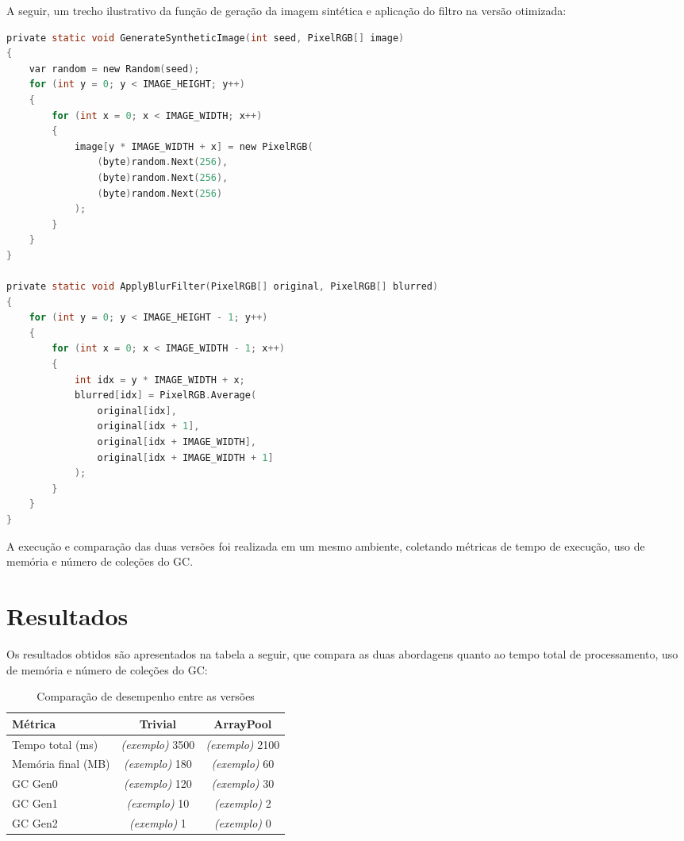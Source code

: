 \documentclass[
	12pt,
	oneside,
	a4paper,
	english,
	brazil,
	]{abntex2}
\begin{document}
{A seguir, um trecho ilustrativo da função de geração da imagem sintética e aplicação do filtro na versão otimizada:

\begin{lstlisting}[language=C]
private static void GenerateSyntheticImage(int seed, PixelRGB[] image)
{
    var random = new Random(seed);
    for (int y = 0; y < IMAGE_HEIGHT; y++)
    {
        for (int x = 0; x < IMAGE_WIDTH; x++)
        {
            image[y * IMAGE_WIDTH + x] = new PixelRGB(
                (byte)random.Next(256),
                (byte)random.Next(256),
                (byte)random.Next(256)
            );
        }
    }
}

private static void ApplyBlurFilter(PixelRGB[] original, PixelRGB[] blurred)
{
    for (int y = 0; y < IMAGE_HEIGHT - 1; y++)
    {
        for (int x = 0; x < IMAGE_WIDTH - 1; x++)
        {
            int idx = y * IMAGE_WIDTH + x;
            blurred[idx] = PixelRGB.Average(
                original[idx],
                original[idx + 1],
                original[idx + IMAGE_WIDTH],
                original[idx + IMAGE_WIDTH + 1]
            );
        }
    }
}
\end{lstlisting}

A execução e comparação das duas versões foi realizada em um mesmo ambiente, coletando métricas de tempo de execução, uso de memória e número de coleções do GC.

\section{Resultados}

Os resultados obtidos são apresentados na tabela a seguir, que compara as duas abordagens quanto ao tempo total de processamento, uso de memória e número de coleções do GC:

\begin{table}[h!]
\centering
\begin{tabular}{|l|c|c|}
\hline
\textbf{Métrica} & \textbf{Trivial} & \textbf{ArrayPool} \\
\hline
Tempo total (ms) &  \textit{(exemplo)} 3500 & \textit{(exemplo)} 2100 \\
Memória final (MB) & \textit{(exemplo)} 180 & \textit{(exemplo)} 60 \\
GC Gen0 & \textit{(exemplo)} 120 & \textit{(exemplo)} 30 \\
GC Gen1 & \textit{(exemplo)} 10 & \textit{(exemplo)} 2 \\
GC Gen2 & \textit{(exemplo)} 1 & \textit{(exemplo)} 0 \\
\hline
\end{tabular}
\caption{Comparação de desempenho entre as versões}
\end{table}

}
\end{document}
